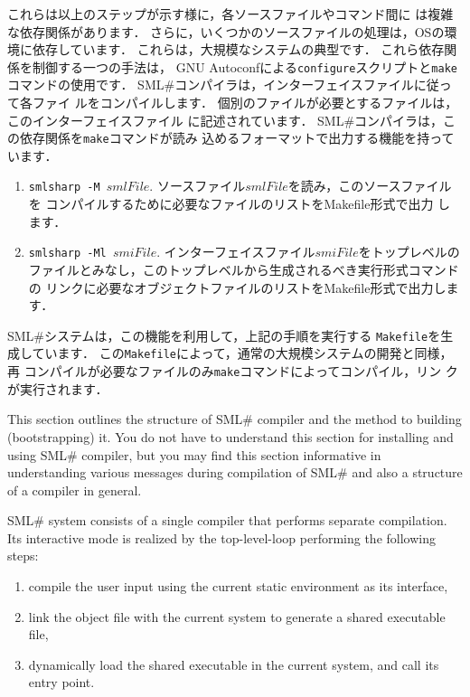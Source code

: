 \documentclass{jbook}
\newcommand{\smlsharp}{SML\#}
\begin{document}
	これらは以上のステップが示す様に，各ソースファイルやコマンド間に
は複雑な依存関係があります．
	さらに，いくつかのソースファイルの処理は，OSの環境に依存しています．
	これらは，大規模なシステムの典型です．
	これら依存関係を制御する一つの手法は，%
GNU Autoconfによる{\tt configure}スクリプトと{\tt make}コマンドの使用です．
	\smlsharp{}コンパイラは，インターフェイスファイルに従って各ファイ
ルをコンパイルします．
	個別のファイルが必要とするファイルは，このインターフェイスファイル
に記述されています．
	\smlsharp{}コンパイラは，この依存関係を{\tt make}コマンドが読み
込めるフォーマットで出力する機能を持っています．
\begin{enumerate}
\item {\tt smlsharp -M $\mathit{smlFile}$}.
	ソースファイル$\mathit{smlFile}$を読み，このソースファイルを
コンパイルするために必要なファイルのリストをMakefile形式で出力
します．
\item {\tt smlsharp -Ml $\mathit{smiFile}$}.
	インターフェイスファイル$\mathit{smiFile}$をトップレベルの
ファイルとみなし，このトップレベルから生成されるべき実行形式コマンドの
リンクに必要なオブジェクトファイルのリストをMakefile形式で出力します．
\end{enumerate}	

	\smlsharp{}システムは，この機能を利用して，上記の手順を実行する
{\tt Makefile}を生成しています．
	この{\tt Makefile}によって，通常の大規模システムの開発と同様，再
コンパイルが必要なファイルのみ{\tt make}コマンドによってコンパイル，リン
クが実行されます．

\else%

	This section outlines the structure of \smlsharp{} compiler and
the method to building (bootstrapping) it.
	You do not have to understand this section for installing and
using \smlsharp{} compiler, but you may find this section informative in
understanding various messages during compilation of \smlsharp{} and also 
a structure of a compiler in general.

	\smlsharp{} system consists of a single compiler that performs
separate compilation. 
	Its interactive mode is realized by the top-level-loop
performing the following steps:
\begin{enumerate}
\item compile the user input using the current static environment as its
interface,
\item link the object file with the current system to generate a shared
executable file,
\item dynamically load the shared executable in the current system, and
call its entry point.
\end{enumerate}
\end{document}
